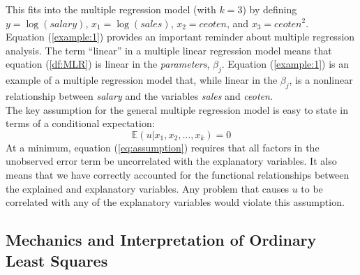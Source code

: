 \documentclass[a4paper, 10pt]{article}
\theoremstyle{definition}	%
\begin{document}
This fits into the multiple regression model (with $k = 3$) by defining $y = \log(\textit{salary})$, $x_1 = \log(\textit{sales})$, $x_2 = \textit{ceoten}$, and $x_3 = \textit{ceoten}^2$.\\
Equation (\ref{example:1}) provides an important reminder about multiple regression analysis. The term ``linear'' in a multiple linear regression model means that equation (\ref{df:MLR}) is linear in the \textit{parameters}, $\beta_j$. Equation (\ref{example:1}) is an example of a multiple regression model that, while linear in the $\beta_j$, is a nonlinear relationship between \textit{salary} and the variables \textit{sales} and \textit{ceoten}.\\
The key assumption for the general multiple regression model is easy to state in terms of a conditional expectation:
\begin{equation}
    \mathbb{E}(u | x_1, x_2, \dots, x_k) = 0
    \label{eq:assumption}
\end{equation}
At a minimum, equation (\ref{eq:assumption}) requires that all factors in the unobserved error term be uncorrelated with the explanatory variables. It also means that we have correctly accounted for the functional relationships between the explained and explanatory variables. Any problem that causes $u$ to be correlated with any of the explanatory variables would violate this assumption.

\subsection{Mechanics and Interpretation of Ordinary Least Squares}
\end{document}
